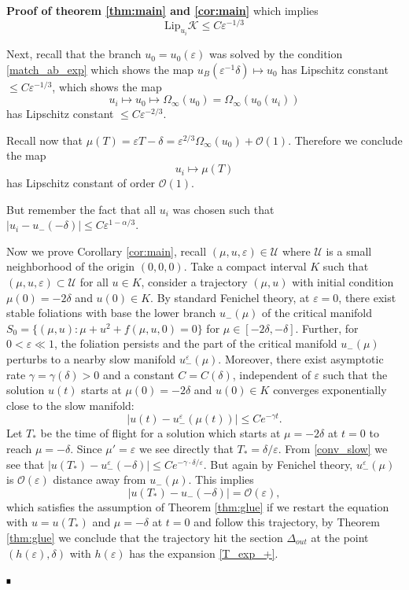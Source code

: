 \documentclass[letterpaper,11pt]{article}
\newcommand{\rmO}{\mathcal{O}}
\newcommand{\eps}{\varepsilon}
\numberwithin{equation}{section}
\theoremstyle{plain}
\newenvironment{Proof}[1][.]%
 {\begin{trivlist}\item[]\textbf{Proof#1 }}%
 {\hspace*{\fill}$\rule{0.3\baselineskip}{0.35\baselineskip}$\end{trivlist}}
\begin{document}
\begin{Proof}[\textbf{ of theorem \ref{thm:main} and \ref{cor:main}}]
which implies
\begin{equation}
\text{Lip}_{u_i} \mathcal{K} \le C\eps^{-1/3}
\end{equation}

Next, recall that the branch $u_0 = u_0(\eps)$ was solved by the condition \eqref{match_ab_exp} which shows the map $u_B(\eps^{-1}\delta) \mapsto u_0$ has Lipschitz constant $\le C\eps^{-1/3}$, which shows the map
\begin{equation}
u_i \mapsto u_0 \mapsto \Omega_\infty(u_0)=\Omega_\infty(u_0(u_i))
\end{equation}
has Lipschitz constant $\le C\eps^{-2/3}$.

Recall now that $\mu(T) = \eps T -\delta = \eps^{2/3}\Omega_\infty(u_0) + \rmO(1)$. Therefore we conclude the map
\begin{equation}
u_i \mapsto \mu(T)
\end{equation}
has Lipschitz constant of order $\rmO(1)$.

But remember the fact that all $u_i$ was chosen such that $|u_i-u_-(-\delta)|\le C\eps^{1-\alpha/3}$.


Now we prove Corollary \ref{cor:main}, recall $(\mu,u,\eps) \in \mathcal{U}$ where $\mathcal{U}$ is a small neighborhood of the origin $(0,0,0)$. Take a compact interval $K$ such that $(\mu, u, \eps) \subset \mathcal{U}$ for all $u \in K$, consider a trajectory $(\mu, u)$ with initial condition $\mu(0) = -2\delta$ and $u(0) \in K$. By standard Fenichel theory, at $\eps = 0$, there exist stable foliations with base the lower branch $u_-(\mu)$ of  the critical manifold $S_0=\{ (\mu, u) : \mu+u^2 + f(\mu, u,0) =0 \}$ for $\mu \in [-2\delta, -\delta]$. Further, for $0<\eps \ll 1$, the foliation persists and the part of the critical manifold $u_-(\mu)$ perturbs to a nearby slow manifold $u_-^{\eps}(\mu)$. Moreover, there exist asymptotic rate $\gamma = \gamma(\delta)>0$ and a constant $C=C(\delta)$, independent of $\eps$ such that the solution $u(t)$ starts at $\mu(0)=-2\delta$ and $u(0) \in K$ converges exponentially close to the slow manifold:
\begin{equation}\label{conv_slow}
|u(t) - u_-^{\eps}(\mu(t))| \le Ce^{-\gamma t}.
\end{equation}
Let $T_*$ be the time of flight for a solution which starts at $\mu = -2\delta$ at $t=0$ to reach $\mu  = -\delta$. Since $\mu' = \eps$ we see directly that $T_* = \delta/\eps$. From \eqref{conv_slow} we see that $|u(T_*) - u_-^{\eps}(-\delta)| \le Ce^{-\gamma \cdot\delta/\eps}$. But again by Fenichel theory, $u_-^\eps(\mu)$ is $\rmO(\eps)$ distance away from $u_-(\mu)$. This implies
\[
|u(T_*) - u_-(-\delta) |  = \rmO(\eps),
\]
which satisfies the assumption of Theorem \ref{thm:glue} if we restart the equation with $u=u(T_*)$ and $\mu = -\delta$ at $t = 0$ and follow this trajectory, by Theorem \ref{thm:glue} we conclude that the trajectory hit the section $\Delta_{out}$ at the point $(h(\eps), \delta)$ with $h(\eps)$ has the expansion \eqref{T_exp_+}.


\end{Proof}
\end{document}
